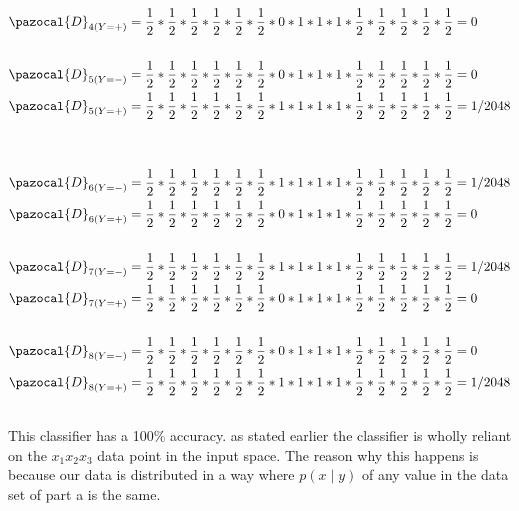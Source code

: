 \documentclass[a4 paper]{article}
\begin{document}
\begin{enumerate}
\begin{equation*}
\begin{split}
\pazocal{D}_{4 (Y=+)} & = \frac{1}{2} *  \frac{1}{2} * \frac{1}{2} * \frac{1}{2} * \frac{1}{2} * \frac{1}{2} * 0 * 1 * 1 * 1 *  \frac{1}{2} *  \frac{1}{2} *  \frac{1}{2} *  \frac{1}{2} *  \frac{1}{2} = 0 \\
\\
\pazocal{D}_{5 (Y=-)} & = \frac{1}{2} *  \frac{1}{2} * \frac{1}{2} * \frac{1}{2} * \frac{1}{2} * \frac{1}{2} * 0 * 1 * 1 * 1 *  \frac{1}{2} *  \frac{1}{2} *  \frac{1}{2} *  \frac{1}{2} *  \frac{1}{2} = 0\\
\pazocal{D}_{5 (Y=+)} & = \frac{1}{2} *  \frac{1}{2} * \frac{1}{2} * \frac{1}{2} * \frac{1}{2} * \frac{1}{2} * 1 * 1 * 1 * 1 *  \frac{1}{2} *  \frac{1}{2} *  \frac{1}{2} *  \frac{1}{2} *  \frac{1}{2} = 1/2048 \\
\\
\pagebreak
\end{split}
\end{equation*}
\begin{equation*}
\begin{split}
\pazocal{D}_{6 (Y=-)} & = \frac{1}{2} *  \frac{1}{2} * \frac{1}{2} * \frac{1}{2} * \frac{1}{2} * \frac{1}{2} * 1 * 1 * 1 * 1 *  \frac{1}{2} *  \frac{1}{2} *  \frac{1}{2} *  \frac{1}{2} *  \frac{1}{2} = 1/2048\\
\pazocal{D}_{6 (Y=+)} & = \frac{1}{2} *  \frac{1}{2} * \frac{1}{2} * \frac{1}{2} * \frac{1}{2} * \frac{1}{2} * 0 * 1 * 1 * 1 *  \frac{1}{2} *  \frac{1}{2} *  \frac{1}{2} *  \frac{1}{2} *  \frac{1}{2} = 0 \\
\\
\pazocal{D}_{7 (Y=-)} & = \frac{1}{2} *  \frac{1}{2} * \frac{1}{2} * \frac{1}{2} * \frac{1}{2} * \frac{1}{2} * 1 * 1 * 1 * 1 *  \frac{1}{2} *  \frac{1}{2} *  \frac{1}{2} *  \frac{1}{2} *  \frac{1}{2} = 1/2048\\
\pazocal{D}_{7 (Y=+)} & = \frac{1}{2} *  \frac{1}{2} * \frac{1}{2} * \frac{1}{2} * \frac{1}{2} * \frac{1}{2} * 0 * 1 * 1 * 1 *  \frac{1}{2} *  \frac{1}{2} *  \frac{1}{2} *  \frac{1}{2} *  \frac{1}{2} = 0 \\
\\
\pazocal{D}_{8 (Y=-)} & = \frac{1}{2} *  \frac{1}{2} * \frac{1}{2} * \frac{1}{2} * \frac{1}{2} * \frac{1}{2} * 0 * 1 * 1 * 1 *  \frac{1}{2} *  \frac{1}{2} *  \frac{1}{2} *  \frac{1}{2} *  \frac{1}{2} = 0\\
\pazocal{D}_{8 (Y=+)} & = \frac{1}{2} *  \frac{1}{2} * \frac{1}{2} * \frac{1}{2} * \frac{1}{2} * \frac{1}{2} * 1 * 1 * 1 * 1 *  \frac{1}{2} *  \frac{1}{2} *  \frac{1}{2} *  \frac{1}{2} *  \frac{1}{2} = 1/2048 \\
\\
\end{split}
\end{equation*}
This classifier has a 100\% accuracy. as stated earlier the classifier is wholly reliant on the $x_1x_2x_3$ data point in the input space. The reason why this happens is because our data is distributed in a way where $p(x \mid y )$ of any value in the data set of part a is the same. 
	\end{enumerate}
	
\end{document}
